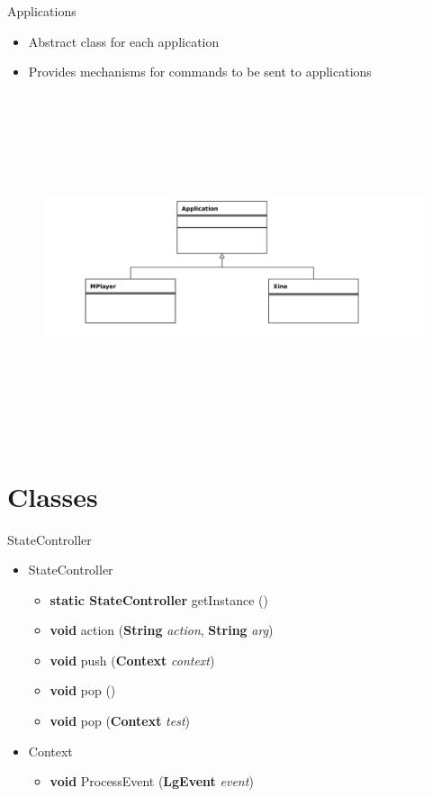 \documentclass[style=smrt,mode=present,paper=screen]{powerdot}
\begin{document}
\begin{slide}{Applications}
\begin{itemize}
	\item Abstract class for each application
	\item Provides mechanisms for commands to be sent to applications
\end{itemize}
\begin{figure}
\includegraphics[height=4in, angle=-90]{../lib/figures/Application-uml}
\end{figure}
\end{slide}

\section{Classes}

\begin{slide}{StateController}
\begin{itemize}
\item StateController
\begin{itemize}
	\item \textbf{static StateController} getInstance ()
	\item \textbf{void} action (\textbf{String} \textit{action}, \textbf{String} \textit{arg})
	\item \textbf{void} push (\textbf{Context} \textit{context})
	\item \textbf{void} pop ()
	\item \textbf{void} pop (\textbf{Context} \textit{test})
\end{itemize}
\item Context
\begin{itemize}
	\item \textbf{void} ProcessEvent (\textbf{LgEvent} \textit{event})
\end{itemize}
\end{itemize}
\end{slide}
\end{document}
